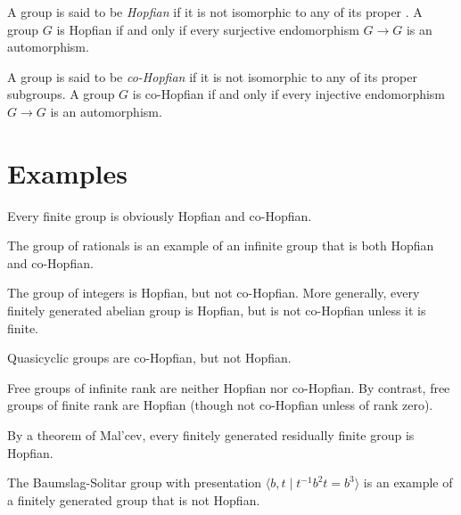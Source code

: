 \documentclass[12pt]{article}
\begin{document}

A group is said to be \emph{Hopfian} if it is not isomorphic to any of its proper .
A group $G$ is Hopfian if and only if every surjective endomorphism $G\to G$ is an automorphism.

A group is said to be \emph{co-Hopfian} if it is not isomorphic to any of its proper subgroups.
A group $G$ is co-Hopfian if and only if every injective endomorphism $G\to G$ is an automorphism.

\section*{Examples}

Every finite group is obviously Hopfian and co-Hopfian.

The group of rationals is an example of an infinite group that is both Hopfian and co-Hopfian.

The group of integers is Hopfian, but not co-Hopfian.
More generally, every finitely generated abelian group is Hopfian,
but is not co-Hopfian unless it is finite.

Quasicyclic groups are co-Hopfian, but not Hopfian.

Free groups of infinite rank are neither Hopfian nor co-Hopfian.
By contrast, free groups of finite rank are Hopfian (though not co-Hopfian unless of rank zero).

By a theorem of Mal'cev, every finitely generated residually finite group is Hopfian.

The Baumslag-Solitar group with presentation $\langle b,t\mid t^{-1}b^2t=b^3\rangle$ is an example of a finitely generated group that is not Hopfian.
\end{document}
